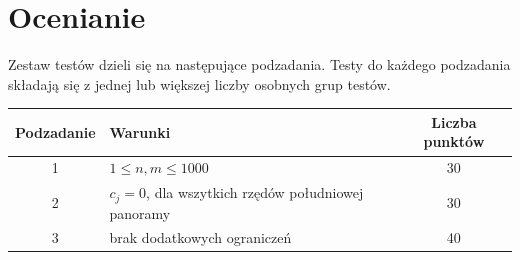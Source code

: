\documentclass[10pt]{article}
\begin{document}

    \section*{Ocenianie}
        
    Zestaw testów dzieli się na następujące podzadania. Testy do każdego podzadania składają się z jednej lub większej liczby osobnych grup testów.
    
    \begin{center}
        \begin{tabular}{ |c|p{9cm}|c| }
            \hline
            \textbf{Podzadanie} & \textbf{Warunki} & \textbf{Liczba punktów}\\
            \hline
            1 & $1 \leq n, m \leq 1000$ & 30\\
            \hline
            2 & $c_{j} = 0$, dla wszytkich rzędów południowej panoramy & 30\\
            \hline
            3 & brak dodatkowych ograniczeń & 40\\
            \hline
        \end{tabular}
    \end{center}
\end{document}
